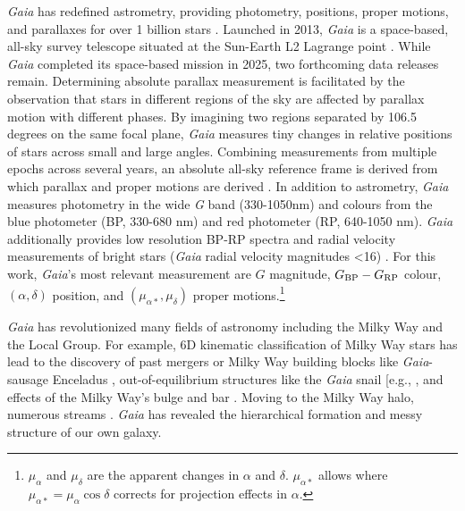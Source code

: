 \emph{Gaia} has redefined astrometry, providing photometry, positions,
proper motions, and parallaxes for over 1 billion stars
\citep{gaialcollaboration+2021}. Launched in 2013, \emph{Gaia} is a
space-based, all-sky survey telescope situated at the Sun-Earth L2
Lagrange point \citep{gaiacollaboration+2016}. While \emph{Gaia}
completed its space-based mission in 2025, two forthcoming data releases
remain. Determining absolute parallax measurement is facilitated by the
observation that stars in different regions of the sky are affected by
parallax motion with different phases. By imagining two regions
separated by 106.5 degrees on the same focal plane, \emph{Gaia} measures
tiny changes in relative positions of stars across small and large
angles. Combining measurements from multiple epochs across several
years, an absolute all-sky reference frame is derived from which
parallax and proper motions are derived \citep{gaiacollaboration+2016}.
In addition to astrometry, \emph{Gaia} measures photometry in the wide
\emph{G} band (330-1050nm) and colours from the blue photometer (BP,
330-680 nm) and red photometer (RP, 640-1050 nm). \emph{Gaia}
additionally provides low resolution BP-RP spectra and radial velocity
measurements of bright stars (\emph{Gaia} radial velocity magnitudes
\textless16) \citep{gaiacollaboration+2016}. For this work,
\emph{Gaia}'s most relevant measurement are \(G\) magnitude,
\(G_{\rm BP} - G_{\rm RP}\) colour, \((\alpha, \delta)\) position, and
\((\mu_{\alpha*}, \mu_\delta)\) proper motions.\footnote{\(\mu_\alpha\)
  and \(\mu_\delta\) are the apparent changes in \(\alpha\) and
  \(\delta\). \(\mu_{\alpha*}\) allows where
  \(\mu_{\alpha*} = \mu_\alpha \cos \delta\) corrects for projection
  effects in \(\alpha\).}

\emph{Gaia} has revolutionized many fields of astronomy including the
Milky Way and the Local Group. For example, 6D kinematic classification
of Milky Way stars has lead to the discovery of past mergers or Milky
Way building blocks like \emph{Gaia}-sausage Enceladus
\citep[e.g.,][]{helmi+2018}, out-of-equilibrium structures like the
\emph{Gaia} snail {[}e.g., \citet{antoja+2018l}, and effects of the
Milky Way's bulge and bar \citep{hunt+vasiliev2025}. Moving to the Milky
Way halo, numerous streams \citep{bonaca+price-whelan2025}. \emph{Gaia}
has revealed the hierarchical formation and messy structure of our own
galaxy.

